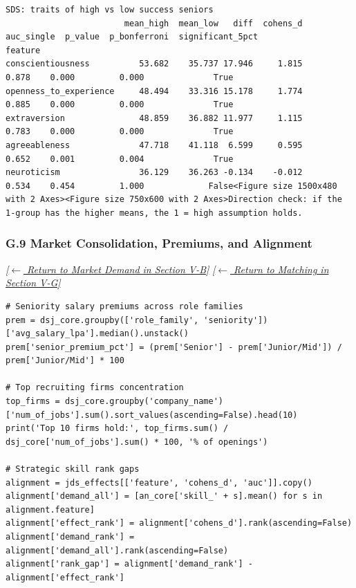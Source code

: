 \documentclass[conference]{IEEEtran}
\begin{document}
\begin{lstlisting}[style=outputstyle,caption={Execution Output G.8b: Senior Personality Group Differences (Table II).},label={out:sds_effects}]
SDS: traits of high vs low success seniors
                        mean_high  mean_low   diff  cohens_d  auc_single  p_value  p_bonferroni  significant_5pct
feature                                                                                                          
conscientiousness          53.682    35.737 17.946     1.815       0.878    0.000         0.000              True
openness_to_experience     48.494    33.316 15.178     1.774       0.885    0.000         0.000              True
extraversion               48.859    36.882 11.977     1.115       0.783    0.000         0.000              True
agreeableness              47.718    41.118  6.599     0.595       0.652    0.001         0.004              True
neuroticism                36.129    36.263 -0.134    -0.012       0.534    0.454         1.000             False<Figure size 1500x480 with 2 Axes><Figure size 750x600 with 2 Axes>Direction check: if the 1-group has the higher means, the 1 = high assumption holds.
\end{lstlisting}

\subsubsection*{G.9 Market Consolidation, Premiums, and Alignment}
\label{lst:market_bridge}\label{lst:matching}
\textit{\hyperref[sec:market_demand]{[$\leftarrow$ Return to Market Demand in Section V-B]}} \quad \textit{\hyperref[sec:company_matching]{[$\leftarrow$ Return to Matching in Section V-G]}}

\begin{lstlisting}[style=pythonstyle,caption={Generating market seniority profiles, salary premiums, and rank gap metrics.},label={lst:market_bridge_code}]
# Seniority salary premiums across role families
prem = dsj_core.groupby(['role_family', 'seniority'])['avg_salary_lpa'].median().unstack()
prem['senior_premium_pct'] = (prem['Senior'] - prem['Junior/Mid']) / prem['Junior/Mid'] * 100

# Top recruiting firms concentration
top_firms = dsj_core.groupby('company_name')['num_of_jobs'].sum().sort_values(ascending=False).head(10)
print('Top 10 firms hold:', top_firms.sum() / dsj_core['num_of_jobs'].sum() * 100, '% of openings')

# Strategic skill rank gaps
alignment = jds_effects[['feature', 'cohens_d', 'auc']].copy()
alignment['demand_all'] = [an_core['skill_' + s].mean() for s in alignment.feature]
alignment['effect_rank'] = alignment['cohens_d'].rank(ascending=False)
alignment['demand_rank'] = alignment['demand_all'].rank(ascending=False)
alignment['rank_gap'] = alignment['demand_rank'] - alignment['effect_rank']
\end{lstlisting}
\end{document}
